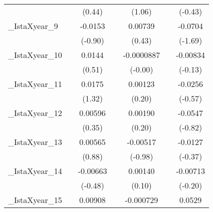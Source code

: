 {\begin{tabular}{l*{6}{c}}
            &                     &      (0.44)         &                     &      (1.06)         &                     &     (-0.43)         \\
[1em]
\_IstaXyear\_9&                     &     -0.0153         &                     &     0.00739         &                     &     -0.0704         \\
            &                     &     (-0.90)         &                     &      (0.43)         &                     &     (-1.69)         \\
[1em]
\_IstaXyear\_10&                     &      0.0144         &                     &  -0.0000887         &                     &    -0.00834         \\
            &                     &      (0.51)         &                     &     (-0.00)         &                     &     (-0.13)         \\
[1em]
\_IstaXyear\_11&                     &      0.0175         &                     &     0.00123         &                     &     -0.0256         \\
            &                     &      (1.32)         &                     &      (0.20)         &                     &     (-0.57)         \\
[1em]
\_IstaXyear\_12&                     &     0.00596         &                     &     0.00190         &                     &     -0.0547         \\
            &                     &      (0.35)         &                     &      (0.20)         &                     &     (-0.82)         \\
[1em]
\_IstaXyear\_13&                     &     0.00565         &                     &    -0.00517         &                     &     -0.0127         \\
            &                     &      (0.88)         &                     &     (-0.98)         &                     &     (-0.37)         \\
[1em]
\_IstaXyear\_14&                     &    -0.00663         &                     &     0.00140         &                     &    -0.00713         \\
            &                     &     (-0.48)         &                     &      (0.10)         &                     &     (-0.20)         \\
[1em]
\_IstaXyear\_15&                     &     0.00908         &                     &   -0.000729         &                     &      0.0529         \\

\end{tabular}}
